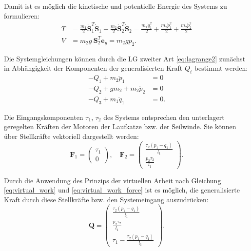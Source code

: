 Damit ist es möglich die kinetische und potentielle Energie des Systems zu formulieren:
\begin{align}
	T &= \frac{m_1}{2} \dot{\mathbf{S}}_1^T \dot{\mathbf{S}}_1 + \frac{m_2}{2} \dot{\mathbf{S}}_2^T \dot{\mathbf{S}}_2 = \frac{m_{1} \dot{q}_{1}^{2}}{2} + \frac{m_{2} \dot{p}_{1}^{2}}{2} + \frac{m_{2} \dot{p}_{2}^{2}}{2} \\
	V &= m_2 g \ \mathbf{S}_2^T \mathbf{e}_y = m_{2} g p_{2}.
\end{align}

Die Systemgleichungen können durch die LG zweiter Art \eqref{eq:lagrange2} zunächst in Abhängigkeit der Komponenten der generalisierten Kraft $Q_i$ bestimmt werden:
\begin{subequations}
	\label{eq:single_crane_sys_w_Q}
	\begin{align}
		- Q_{1} + m_{2} \ddot{p}_{1} &= 0\\
		- Q_{2} + g m_{2} + m_{2} \ddot{p}_{2} &= 0\\
		- Q_{3} + m_{1} \ddot{q}_{1} &= 0.
	\end{align}
\end{subequations}

Die Eingangskomponenten $\tau_1$, $\tau_2$ des Systems entsprechen den unterlagert geregelten Kräften der Motoren der Laufkatze bzw. der Seilwinde. Sie können über Stellkräfte vektoriell dargestellt werden:
\begin{equation}
	\mathbf{F}_1 =
	\left(\begin{matrix}
		\tau_{1} \\
		0
	\end{matrix}\right), \quad
	\mathbf{F}_2 =
	\left(\begin{matrix}
		\frac{\tau_{2} \left(p_{1} - q_{1}\right)}{l_{1}}\\
		\frac{p_{2} \tau_{2}}{l_{1}}
	\end{matrix}\right).
\end{equation}

Durch die Anwendung des Prinzips der virtuellen Arbeit nach Gleichung \eqref{eq:virtual_work} und \eqref{eq:virtual_work_force} ist es möglich, die generalisierte Kraft durch diese Stellkräfte bzw. den Systemeingang auszudrücken:
\begin{equation}
	\mathbf{Q}=
	\left(\begin{matrix}
		\frac{\tau_{2} \left(p_{1} - q_{1}\right)}{l_{1}}\\
		\frac{p_{2} \tau_{2}}{l_{1}}\\
		\tau_{1} - \frac{\tau_{2} \left(p_{1} - q_{1}\right)}{l_{1}}
	\end{matrix}\right).
\end{equation}

